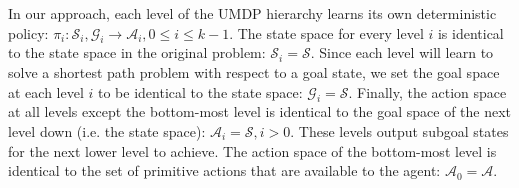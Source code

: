 \documentclass{article} %
\newcommand{\gdknote}[1]{\textcolor{blue}{\textbf{GDK: #1}}}
\begin{document}
In our approach, each level of the UMDP hierarchy learns its own deterministic policy: $\pi_i: \mathcal{S}_i,\mathcal{G}_i \rightarrow \mathcal{A}_i, 0 \leq i \leq k-1$. The state space for every level $i$ is identical to the state space in the original problem: $\mathcal{S}_i = \mathcal{S}$. Since each level will learn to solve a shortest path problem with respect to a goal state, we set the goal space at each level $i$ to be identical to the state space: $\mathcal{G}_i = \mathcal{S}$. Finally, the action space at all levels except the bottom-most level is identical to the goal space of the next level down (i.e. the state space): $\mathcal{A}_i = \mathcal{S},i > 0$. These levels output subgoal states for the next lower level to achieve. The action space of the bottom-most level is identical to the set of primitive actions that are available to the agent: $\mathcal{A}_0 =\mathcal{A}$.

\end{document}
